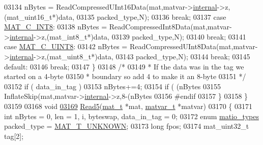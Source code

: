 \begin{DoxyCode}
{{{{{{{{{{{{{{{{03134                 nBytes = ReadCompressedUInt16Data(mat,matvar->\hyperlink{group___m_a_t_a6e97e3ed9f40c49322c18561c2a94e92}{internal}->z,(mat\_uint16\_t*)data,
03135                                                   packed\_type,N);
03136                 \textcolor{keywordflow}{break};
03137             \textcolor{keywordflow}{case} \hyperlink{group___m_a_t_ggad4d60ae7b709fc81bfd744fb4c857c40a984ff310f9e906100fcff95f704f43c5}{MAT\_C\_INT8}:
03138                 nBytes = ReadCompressedInt8Data(mat,matvar->\hyperlink{group___m_a_t_a6e97e3ed9f40c49322c18561c2a94e92}{internal}->z,(mat\_int8\_t*)data,
03139                                                 packed\_type,N);
03140                 \textcolor{keywordflow}{break};
03141             \textcolor{keywordflow}{case} \hyperlink{group___m_a_t_ggad4d60ae7b709fc81bfd744fb4c857c40a81270f8093cb4808e992c1d29d84d4e3}{MAT\_C\_UINT8}:
03142                 nBytes = ReadCompressedUInt8Data(mat,matvar->\hyperlink{group___m_a_t_a6e97e3ed9f40c49322c18561c2a94e92}{internal}->z,(mat\_uint8\_t*)data,
03143                                                  packed\_type,N);
03144                 \textcolor{keywordflow}{break};
03145             \textcolor{keywordflow}{default}:
03146                 \textcolor{keywordflow}{break};
03147         \}
03148         \textcolor{comment}{/*}
03149 \textcolor{comment}{         * If the data was in the tag we started on a 4-byte}
03150 \textcolor{comment}{         * boundary so add 4 to make it an 8-byte}
03151 \textcolor{comment}{         */}
03152         \textcolor{keywordflow}{if} ( data\_in\_tag )
03153             nBytes+=4;
03154         \textcolor{keywordflow}{if} ( (nBytes %
03155             InflateSkip(mat,matvar->\hyperlink{group___m_a_t_a6e97e3ed9f40c49322c18561c2a94e92}{internal}->z,8-(nBytes %
03156 \textcolor{preprocessor}{#endif}
03157     \}
03158 \}
03159 
03168 \textcolor{keywordtype}{void}
\hyperlink{mat5_8c_abd8669832a02e759fe190bf2724f60ae}{03169} \hyperlink{mat5_8c_abd8669832a02e759fe190bf2724f60ae}{Read5}(\hyperlink{struct__mat__t}{mat\_t} *mat, \hyperlink{group___m_a_t_structmatvar__t}{matvar\_t} *matvar)
03170 \{
03171     \textcolor{keywordtype}{int} nBytes = 0, len = 1, i, byteswap, data\_in\_tag = 0;
03172     \textcolor{keyword}{enum} \hyperlink{group___m_a_t_gacf7b3b879282b7ab3a51190e49bf3453}{matio\_types} packed\_type = \hyperlink{group___m_a_t_ggacf7b3b879282b7ab3a51190e49bf3453a2a7318fe8bf9464935e7ed8902618293}{MAT\_T\_UNKNOWN};
03173     \textcolor{keywordtype}{long} fpos;
03174     mat\_uint32\_t tag[2];
}}}}}}}}}}}}}}}}
\end{DoxyCode}
